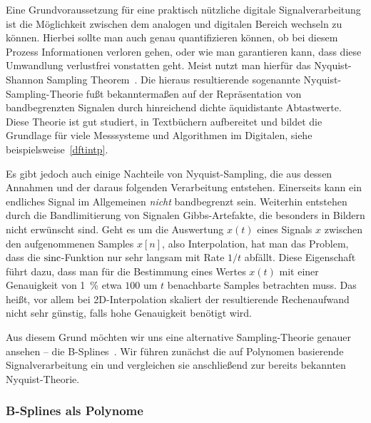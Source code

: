 %
Eine Grundvoraussetzung f\"ur eine praktisch n\"utzliche digitale Signalverarbeitung ist die M\"oglichkeit zwischen dem analogen und digitalen Bereich wechseln zu k\"onnen. Hierbei sollte man auch genau quantifizieren k\"onnen, ob bei diesem Prozess Informationen verloren gehen, oder wie man garantieren kann, dass diese Umwandlung verlustfrei vonstatten geht. Meist nutzt man hierf\"ur das Nyquist-Shannon Sampling Theorem~\cite[Kapitel~1.4.2]{proakis2013}. Die hieraus resultierende sogenannte Nyquist-Sampling-Theorie fu{\ss}t bekannterma{\ss}en auf der Repr\"asentation von bandbegrenzten Signalen durch hinreichend dichte \"aquidistante Abtastwerte. Diese Theorie ist gut studiert, in Textb\"uchern aufbereitet und bildet die Grundlage f\"ur viele Messsysteme und Algorithmen im Digitalen, siehe beispielsweise~\cref{dftintp}.

Es gibt jedoch auch einige Nachteile von Nyquist-Sampling, die aus dessen Annahmen und der daraus folgenden Verarbeitung entstehen. Einerseits kann ein endliches Signal im Allgemeinen \emph{nicht} bandbegrenzt sein. Weiterhin entstehen durch die Bandlimitierung von Signalen Gibbs-Artefakte, die besonders in Bildern nicht erw\"unscht sind. Geht es um die Auswertung $x(t)$ eines Signals $x$ zwischen den aufgenommenen Samples $x[n]$, also Interpolation, hat man das Problem, dass die $\operatorname*{sinc}$-Funktion nur sehr langsam mit Rate $1/t$ abf\"allt. Diese Eigenschaft f\"uhrt dazu, dass man f\"ur die Bestimmung eines Wertes $x(t)$ mit einer Genauigkeit von \SI{1}{\percent} etwa $100$ um $t$ benachbarte Samples betrachten muss. Das hei{\ss}t, vor allem bei 2D-Interpolation skaliert der resultierende Rechenaufwand nicht sehr g\"unstig, falls hohe Genauigkeit ben\"otigt wird.

Aus diesem Grund m\"ochten wir uns eine alternative Sampling-Theorie genauer ansehen -- die B-Splines~\cite{unser1999splines_mag}. Wir f\"uhren zun\"achst die auf Polynomen basierende Signalverarbeitung ein und vergleichen sie anschlie{\ss}end zur bereits bekannten Nyquist-Theorie.

\subsubsection{B-Splines als Polynome}

